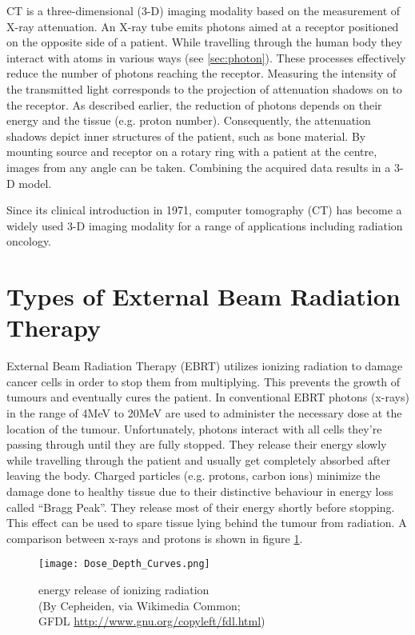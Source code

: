 CT is a three-dimensional (3-D) imaging modality based on the measurement of X-ray attenuation.
An X-ray tube emits photons aimed at a receptor positioned on the opposite side of a patient. While travelling through the human body they interact with atoms in various ways (see \ref{sec:photon}). These processes effectively reduce the number of photons reaching the receptor.  Measuring the intensity of the transmitted light corresponds to the projection of attenuation shadows on to the receptor.
As described earlier, the reduction of photons depends on their energy and the tissue (e.g. proton number).
Consequently, the attenuation shadows depict inner structures of the patient, such as bone material.
By mounting source and receptor on a rotary ring with a patient at the centre, images from any angle can be taken. Combining the acquired data results in a 3-D model.

Since its clinical introduction in 1971, computer tomography (CT) has become a widely used 3-D imaging modality for a range of applications including radiation oncology. 



\section{Types of External Beam Radiation Therapy}
External Beam Radiation Therapy (EBRT) utilizes ionizing radiation to damage cancer cells in order to stop them from multiplying.
This prevents the growth of tumours and eventually cures the patient. 
In conventional EBRT photons (x-rays) in the range of 4MeV to 20MeV are used to administer the necessary dose at the location of the tumour. Unfortunately, photons interact with all cells
they're passing through until they are fully stopped. They release their energy slowly while travelling through the patient and usually get completely absorbed after leaving the body.
Charged particles (e.g. protons, carbon ions) minimize the damage done to healthy tissue due to their distinctive behaviour in energy loss called ``Bragg Peak''.
They release most of their energy shortly before stopping. \cite{Nakamura2010} This effect can be used to spare tissue lying behind the tumour from radiation. \cite{Paganetti2005} %
A comparison between x-rays and protons is shown in figure \ref{fig:bragg}.

\begin{figure}[!h]
	\centering
	\texttt{[image: Dose\_Depth\_Curves.png]}
	\caption{energy release of ionizing radiation \\(By Cepheiden, via Wikimedia Common;\\ GFDL \url{http://www.gnu.org/copyleft/fdl.html})}
	\label{fig:bragg}
\end{figure}


